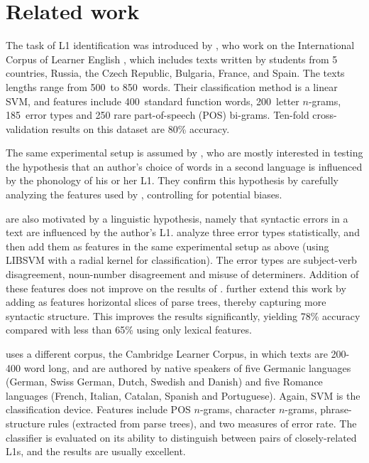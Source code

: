 \documentclass[11pt,letterpaper]{article}
\begin{document}
\section{Related work}
\label{sec:literature}
The task of L1 identification was introduced by
\citet{koppel2005automatically,koppel2005determining}, who work on the
International Corpus of Learner English \citep{icle}, which includes
texts written by students from 5 countries, Russia, the Czech Republic, Bulgaria,
France, and Spain. The texts lengths range from 500~to 850~words. Their
classification method is a linear SVM, and features include 400~standard function words, 200~letter $n$-grams, 185~error types and 250
rare part-of-speech (POS) bi-grams. Ten-fold cross-validation results
on this dataset are 80\% accuracy.

The same experimental setup is assumed by
\citet{tsur-rappoport:2007:Cognitive-2007}, who are mostly interested
in testing the hypothesis that an author's choice of words in a second
language is influenced by the phonology of his or her L1. They confirm
this hypothesis by carefully analyzing the features used by
\citeauthor{koppel2005automatically}, controlling for potential
biases.

\citet{Wong-Dras:2009:ALTA2009,wong-dras:2011:EMNLP} are also
motivated by a linguistic hypothesis, namely that syntactic errors in
a text are influenced by the author's
L1. \citet{Wong-Dras:2009:ALTA2009} analyze three error types
statistically, and then add them as features in the same experimental
setup as above (using LIBSVM with a radial kernel for
classification). The error types are subject-verb disagreement,
noun-number disagreement and misuse of determiners. Addition of these
features does not improve on the results of
\citeauthor{koppel2005automatically}. \citet{wong-dras:2011:EMNLP}
further extend this work by adding as features horizontal slices of
parse trees, thereby capturing more syntactic structure. This improves
the results significantly, yielding 78\% accuracy compared with less
than 65\% using only lexical features.

\citet{kochmar2011identification} uses a different corpus, the
Cambridge Learner Corpus, in which texts are 200-400 word long, and
are authored by native speakers of five Germanic languages (German,
Swiss German, Dutch, Swedish and Danish) and five Romance languages
(French, Italian, Catalan, Spanish and Portuguese). Again, SVM is the
classification device. Features include POS $n$-grams, character
$n$-grams, phrase-structure rules (extracted from parse trees), and
two measures of error rate. The classifier is evaluated on its ability
to distinguish between pairs of closely-related L1s, and the results
are usually excellent.
\end{document}
